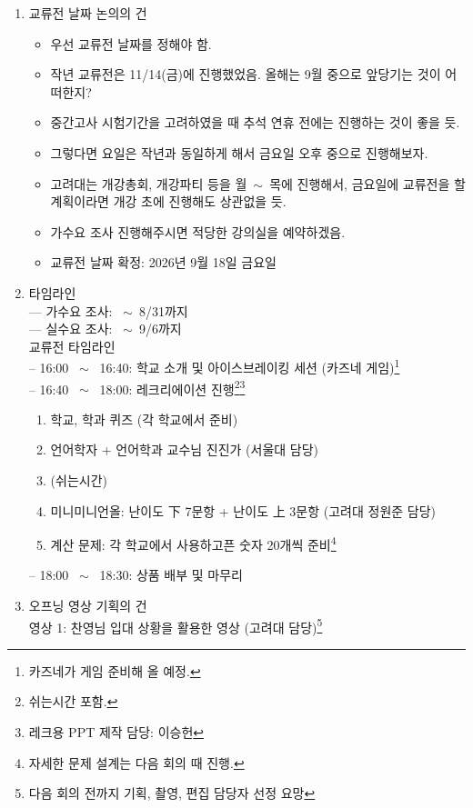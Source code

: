 \documentclass{oblivoir}
\begin{document}
\begin{enumerate}
    \item 교류전 날짜 논의의 건
    \begin{itemize}
        \item [승헌] 우선 교류전 날짜를 정해야 함.
        \item [찬영] 작년 교류전은 11/14(금)에 진행했었음. 올해는 9월 중으로 앞당기는 것이 어떠한지?
        \item [원준] 중간고사 시험기간을 고려하였을 때 추석 연휴 전에는 진행하는 것이 좋을 듯.
        \item [승헌] 그렇다면 요일은 작년과 동일하게 해서 금요일 오후 중으로 진행해보자. 
        \item [세찬] 고려대는 개강총회, 개강파티 등을 월~$\sim$~목에 진행해서, 금요일에 교류전을 할 계획이라면 개강 초에 진행해도 상관없을 듯.
        \item [승헌] 가수요 조사 진행해주시면 적당한 강의실을 예약하겠음.
        \item 교류전 날짜 확정: 2026년 9월 18일 금요일
    \end{itemize}
    \item 타임라인
    \\--- 가수요 조사: ~$\sim$~8/31까지
    \\--- 실수요 조사: ~$\sim$~9/6까지 
    \\ 교류전 타임라인
    \\-- 16:00 ~$\sim$~ 16:40: 학교 소개 및 아이스브레이킹 세션 (카즈네 게임)\footnote{카즈네가 게임 준비해 올 예정.}
    \\-- 16:40 ~$\sim$~ 18:00: 레크리에이션 진행\footnote{쉬는시간 포함.}\footnote{레크용 PPT 제작 담당: 이승헌}
    \begin{enumerate}
        \item 학교, 학과 퀴즈 (각 학교에서 준비)
        \item 언어학자 + 언어학과 교수님 진진가 (서울대 담당)
        \item (쉬는시간)
        \item 미니미니언올: 난이도 下 7문항 + 난이도 上 3문항 (고려대 정원준 담당)
        \item 계산 문제: 각 학교에서 사용하고픈 숫자 20개씩 준비\footnote{자세한 문제 설계는 다음 회의 때 진행.}
    \end{enumerate}
    -- 18:00 ~$\sim$~ 18:30: 상품 배부 및 마무리
    \item 오프닝 영상 기획의 건
    \\영상 1: 찬영님 입대 상황을 활용한 영상 (고려대 담당)\footnote{다음 회의 전까지 기획, 촬영, 편집 담당자 선정 요망}

\end{enumerate}
\end{document}
